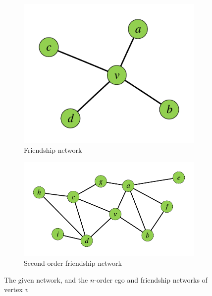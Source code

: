 \begin{figure}[t]
\begin{subfigure}[b]{0.3\textwidth}
                \includegraphics[width=\textwidth]{./images/friends.pdf}
                \caption{Friendship network}
                \label{fig:1-d}
        \end{subfigure}
        \begin{subfigure}[b]{0.5\textwidth}
                \includegraphics[width=\textwidth]{./images/multi-oder-friends.pdf}
                \caption{Second-order friendship network}
                \label{fig:1-e}
        \end{subfigure}
        \caption{The given network, and the $n$-order ego and friendship networks of vertex $v$}
        \label{fig:1}
\end{figure}

